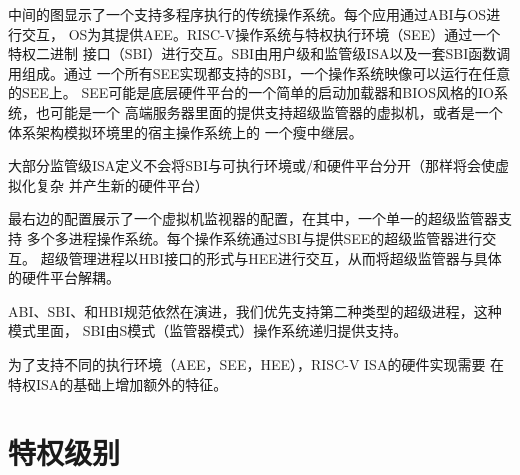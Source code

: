 中间的图显示了一个支持多程序执行的传统操作系统。每个应用通过ABI与OS进行交互，
OS为其提供AEE。RISC-V操作系统与特权执行环境（SEE）通过一个特权二进制
接口（SBI）进行交互。SBI由用户级和监管级ISA以及一套SBI函数调用组成。通过
一个所有SEE实现都支持的SBI，一个操作系统映像可以运行在任意的SEE上。
SEE可能是底层硬件平台的一个简单的启动加载器和BIOS风格的IO系统，也可能是一个
高端服务器里面的提供支持超级监管器的虚拟机，或者是一个体系架构模拟环境里的宿主操作系统上的
一个瘦中继层。
\begin{commentary}

大部分监管级ISA定义不会将SBI与可执行环境或/和硬件平台分开（那样将会使虚拟化复杂
并产生新的硬件平台）
\end{commentary}


最右边的配置展示了一个虚拟机监视器的配置，在其中，一个单一的超级监管器支持
多个多进程操作系统。每个操作系统通过SBI与提供SEE的超级监管器进行交互。
超级管理进程以HBI接口的形式与HEE进行交互，从而将超级监管器与具体的硬件平台解耦。

\begin{commentary}

ABI、SBI、和HBI规范依然在演进，我们优先支持第二种类型的超级进程，这种模式里面，
SBI由S模式（监管器模式）操作系统递归提供支持。
\end{commentary}


为了支持不同的执行环境（AEE，SEE，HEE），RISC-V ISA的硬件实现需要
在特权ISA的基础上增加额外的特征。

\section{特权级别
  }

